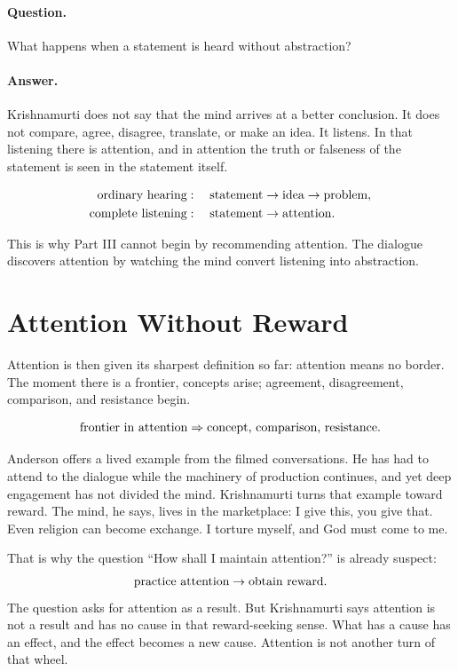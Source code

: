 \documentclass[11pt,oneside]{book}
\begin{document}
\paragraph{Question.}
What happens when a statement is heard without abstraction?

\paragraph{Answer.}
Krishnamurti does not say that the mind arrives at a better conclusion. It does not compare, agree, disagree, translate, or make an idea. It listens. In that listening there is attention, and in attention the truth or falseness of the statement is seen in the statement itself.

\begin{align}
\hbox{ordinary hearing}
&:\quad
\hbox{statement}\to\hbox{idea}\to\hbox{problem},\\
\hbox{complete listening}
&:\quad
\hbox{statement}\to\hbox{attention}.
\end{align}

This is why Part III cannot begin by recommending attention. The dialogue discovers attention by watching the mind convert listening into abstraction.

\section{Attention Without Reward}

Attention is then given its sharpest definition so far: attention means no border. The moment there is a frontier, concepts arise; agreement, disagreement, comparison, and resistance begin.

\begin{equation}
\hbox{frontier in attention}
\Rightarrow
\hbox{concept, comparison, resistance}.
\end{equation}

Anderson offers a lived example from the filmed conversations. He has had to attend to the dialogue while the machinery of production continues, and yet deep engagement has not divided the mind. Krishnamurti turns that example toward reward. The mind, he says, lives in the marketplace: I give this, you give that. Even religion can become exchange. I torture myself, and God must come to me.

That is why the question ``How shall I maintain attention?'' is already suspect:
\begin{equation}
\hbox{practice attention}
\to
\hbox{obtain reward}.
\end{equation}
The question asks for attention as a result. But Krishnamurti says attention is not a result and has no cause in that reward-seeking sense. What has a cause has an effect, and the effect becomes a new cause. Attention is not another turn of that wheel.
\end{document}

